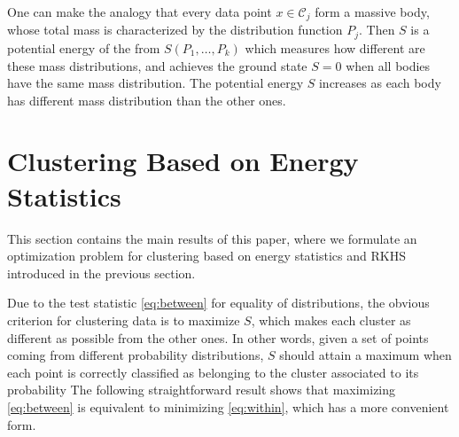\documentclass[aps,preprint,nofootinbib,floatfix]{revtex4-1}
\newcommand\C{{\mathcal{C}}}
\begin{document}
One can make the analogy 
that every data point $ x \in \C_j$ form a massive body, 
whose total mass is characterized by the distribution function $P_j$. 
Then $S$ is a potential
energy of the from $S(P_1,\dotsc,P_k)$ which measures how different
are these
mass distributions, and achieves the ground state
$S=0$ when all bodies have the same mass distribution. The potential energy
$S$ increases as each body has different mass distribution than the other 
ones.



\section{Clustering Based on Energy Statistics}
\label{sec:clustering_theory}

This section contains the main results of this paper, where 
we formulate an optimization problem for clustering 
based on energy statistics and RKHS introduced in the previous section.

Due to the test statistic \eqref{eq:between} for equality of distributions,
the obvious
criterion for clustering data is to 
maximize $S$, which makes 
each cluster as different
as possible from the other ones.
In other words, given a set of points coming from different probability
distributions, $S$ should attain a maximum when each point is correctly
classified as belonging to the cluster associated to its probability
The following 
straightforward result
shows that maximizing \eqref{eq:between} is equivalent to minimizing
\eqref{eq:within}, which has a more convenient form.
\end{document}
